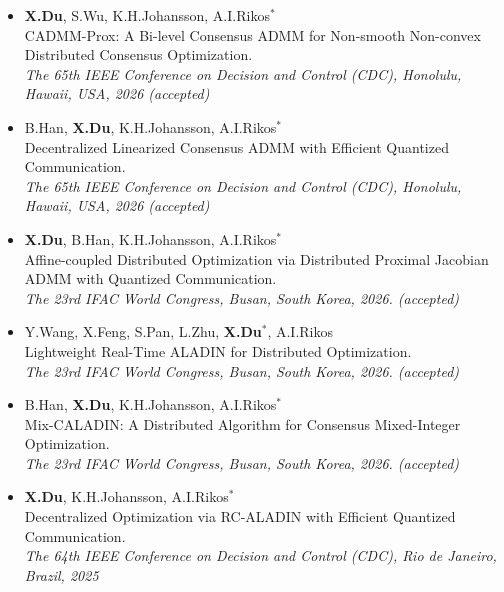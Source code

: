 \documentclass[paper=a4,fontsize=11pt]{scrartcl} %
\newcommand{\EducationEntry}[4]{
		\noindent \textbf{#1} \hfill      %
		\colorbox{White}{%
			\parbox{5cm}{%
			\hfill\color{Black}#2}} \par  %
		\noindent \textit{#3} \par        %
		\noindent\hangindent=2em\hangafter=0 \small #4 %
		\normalsize \par}
\begin{document}
\begin{itemize}
				\item [\textbf{C17}] { \textbf{X.Du},  S.Wu, K.H.Johansson,  A.I.Rikos$^*$   \\
		{CADMM-Prox: A Bi-level Consensus ADMM for Non-smooth Non-convex Distributed Consensus Optimization.}\\
		\emph{The 65th IEEE Conference on Decision and Control (CDC), Honolulu, Hawaii, USA, 2026 (accepted)
	} }
	
			\item [\textbf{C16}] {B.Han, \textbf{X.Du},   K.H.Johansson,  A.I.Rikos$^*$   \\
		{Decentralized Linearized Consensus ADMM with Efficient Quantized Communication.}\\
		\emph{The 65th IEEE Conference on Decision and Control (CDC), Honolulu, Hawaii, USA, 2026 (accepted)
	} }
	
	
		\item [\textbf{C15}] {\textbf{X.Du}, B.Han,  K.H.Johansson,  A.I.Rikos$^*$   \\
		{Affine-coupled Distributed  Optimization via Distributed Proximal Jacobian ADMM with Quantized Communication.}\\
		\emph{The 23rd IFAC World Congress, Busan, South Korea, 2026. (accepted)
	} }
	
		\item [\textbf{C14}] {Y.Wang, X.Feng, S.Pan, L.Zhu, \textbf{X.Du}$^*$,  A.I.Rikos   \\
		{Lightweight Real-Time ALADIN for Distributed Optimization.}\\
		\emph{The 23rd IFAC World Congress, Busan, South Korea, 2026. (accepted)
	} }
	
		\item [\textbf{C13}] {B.Han, \textbf{X.Du}, K.H.Johansson,  A.I.Rikos$^*$ \\
		{Mix-CALADIN: A Distributed Algorithm for Consensus Mixed-Integer Optimization.}\\
		\emph{The 23rd IFAC World Congress, Busan, South Korea, 2026. (accepted)
	} }
	
		\item [\textbf{C12}] {\textbf{X.Du}, K.H.Johansson,  A.I.Rikos$^*$ \\
		{Decentralized Optimization via RC-ALADIN with Efficient Quantized Communication.}\\
		\emph{The 64th IEEE Conference on Decision and Control (CDC), Rio de Janeiro, Brazil, 2025
	} }


\end{itemize}
\end{document}
